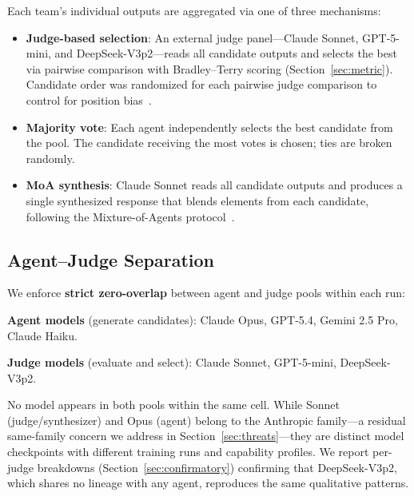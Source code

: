 \documentclass[10pt,twocolumn]{article}
\theoremstyle{remark}
\begin{document}
Each team's individual outputs are aggregated via one of three mechanisms:

\begin{itemize}[nosep]
  \item \textbf{Judge-based selection}: An external judge panel---Claude Sonnet, GPT-5-mini, and DeepSeek-V3p2---reads all candidate outputs and selects the best via pairwise comparison with Bradley--Terry scoring (Section~\ref{sec:metric}). Candidate order was randomized for each pairwise judge comparison to control for position bias~\cite{stureborg2024evaluation}.
  \item \textbf{Majority vote}: Each agent independently selects the best candidate from the pool. The candidate receiving the most votes is chosen; ties are broken randomly.
  \item \textbf{MoA synthesis}: Claude Sonnet reads all candidate outputs and produces a single synthesized response that blends elements from each candidate, following the Mixture-of-Agents protocol~\cite{wang2024mixture}.
\end{itemize}

\subsection{Agent--Judge Separation}
\label{sec:separation}

We enforce \textbf{strict zero-overlap} between agent and judge pools within each run:

\textbf{Agent models} (generate candidates): Claude Opus, GPT-5.4, Gemini 2.5 Pro, Claude Haiku.

\textbf{Judge models} (evaluate and select): Claude Sonnet, GPT-5-mini, DeepSeek-V3p2.

No model appears in both pools within the same cell. While Sonnet (judge/synthesizer) and Opus (agent) belong to the Anthropic family---a residual same-family concern we address in Section~\ref{sec:threats}---they are distinct model checkpoints with different training runs and capability profiles. We report per-judge breakdowns (Section~\ref{sec:confirmatory}) confirming that DeepSeek-V3p2, which shares no lineage with any agent, reproduces the same qualitative patterns.
\end{document}
